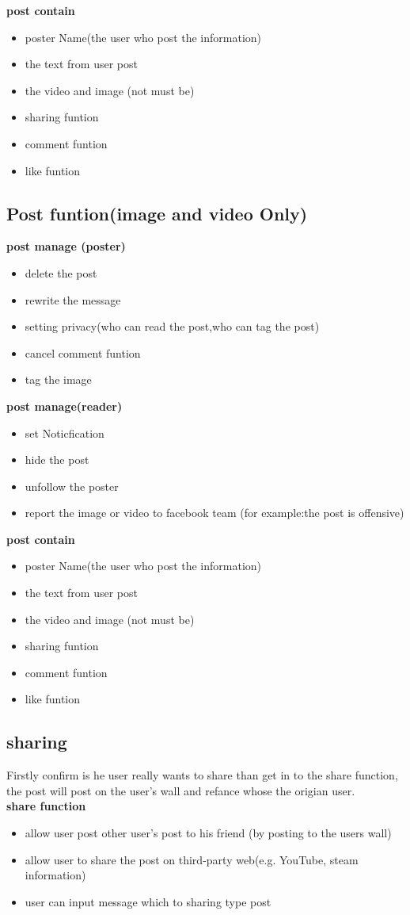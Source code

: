 \textbf{post contain}
\begin{itemize}
\item poster Name(the user who post the information)
\item the text from user post
\item the video and image (not must be)
\item sharing funtion
\item comment funtion
\item like funtion
\end{itemize}


\subsection{Post funtion(image and video Only)}
\textbf{post manage (poster)}
\begin{itemize}
\item delete the post
\item rewrite the message
\item setting privacy(who can read the post,who can tag the post)
\item cancel comment funtion
\item tag the image 
\end{itemize}

\textbf{post manage(reader)}
\begin{itemize}
\item set Noticfication
\item hide the post 
\item unfollow the poster
\item report the image or video to facebook team (for example:the post is
      offensive)
\end{itemize}

\textbf{post contain}
\begin{itemize}
\item poster Name(the user who post the information)
\item the text from user post
\item the video and image (not must be)
\item sharing funtion
\item comment funtion
\item like funtion
\end{itemize}


\subsection{sharing}
Firstly confirm is he user really wants to share than get in to the share
function, the post will post on the user's wall and refance whose the origian
user.\\
\textbf{share function}
\begin{itemize}
\item allow user post other user's post to his friend (by posting to the users
      wall)
\item allow user to share the post on third-party web(e.g. YouTube, steam
      information)
\item user can input message which to sharing type post 
\end{itemize}

